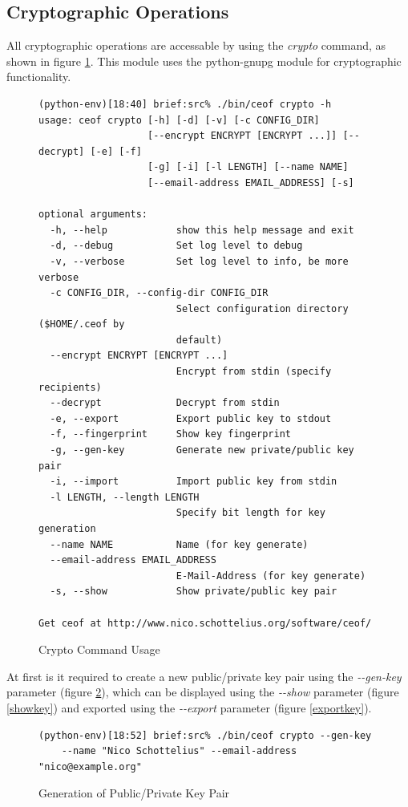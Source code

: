 \subsection{Cryptographic Operations}
All cryptographic operations are accessable by using the \textit{crypto}
command, as shown in figure \ref{cryptohelp}.
This module uses the python-gnupg module for cryptographic functionality.
\begin{figure}
\caption{Crypto Command Usage}
\label{cryptohelp}
\begin{verbatim}
(python-env)[18:40] brief:src% ./bin/ceof crypto -h
usage: ceof crypto [-h] [-d] [-v] [-c CONFIG_DIR]
                   [--encrypt ENCRYPT [ENCRYPT ...]] [--decrypt] [-e] [-f]
                   [-g] [-i] [-l LENGTH] [--name NAME]
                   [--email-address EMAIL_ADDRESS] [-s]

optional arguments:
  -h, --help            show this help message and exit
  -d, --debug           Set log level to debug
  -v, --verbose         Set log level to info, be more verbose
  -c CONFIG_DIR, --config-dir CONFIG_DIR
                        Select configuration directory ($HOME/.ceof by
                        default)
  --encrypt ENCRYPT [ENCRYPT ...]
                        Encrypt from stdin (specify recipients)
  --decrypt             Decrypt from stdin
  -e, --export          Export public key to stdout
  -f, --fingerprint     Show key fingerprint
  -g, --gen-key         Generate new private/public key pair
  -i, --import          Import public key from stdin
  -l LENGTH, --length LENGTH
                        Specify bit length for key generation
  --name NAME           Name (for key generate)
  --email-address EMAIL_ADDRESS
                        E-Mail-Address (for key generate)
  -s, --show            Show private/public key pair

Get ceof at http://www.nico.schottelius.org/software/ceof/
\end{verbatim}
\end{figure}
At first is it required to create a new public/private key pair using
the \textit{-{}-gen-key} parameter (figure \ref{genkey}), which can
be displayed using the \textit{-{}-show} parameter (figure \ref{showkey})
and exported using the \textit{-{}-export}
parameter (figure \ref{exportkey}).
\begin{figure}
\caption{Generation of Public/Private Key Pair}
\label{genkey}
\begin{verbatim}
(python-env)[18:52] brief:src% ./bin/ceof crypto --gen-key 
    --name "Nico Schottelius" --email-address "nico@example.org"
\end{verbatim}
\end{figure}
